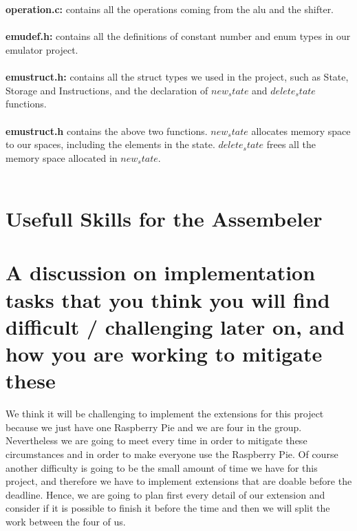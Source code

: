 \documentclass[a4paper]{article}
\begin{document}
\\\\
\textbf{operation.c:} contains all the operations coming from the alu and the shifter.
\\\\
\textbf{emudef.h:} contains all the definitions of constant number and enum types in our emulator project.
\\\\
\textbf{emustruct.h:} contains all the struct types we used in the project, such as State, Storage and Instructions, and the declaration of $new_state$ and $delete_state$ functions.
\\\\
\textbf{emustruct.h} contains the above two functions. $new_state$ allocates memory space to our spaces, including the elements in the state. $delete_state$ frees all the memory space allocated in $new_state$.
\\\\


\section{Usefull Skills for the Assembeler}

\section{A discussion on implementation tasks that you think you will find difficult / challenging later on,
and how you are working to mitigate these}
We think it will be challenging to implement the extensions for this project because we just have one Raspberry Pie and we are four in the group. Nevertheless we are going to meet every time in order to mitigate these circumstances and in order to make everyone use the Raspberry Pie.
Of course another difficulty is going to be the small amount of time we have for this project, and therefore we have to implement extensions that are doable before the deadline. Hence, we are going to plan first every detail of our extension and consider if it is possible to finish it before the time and then we will split the work between the four of us.
\end{document}
